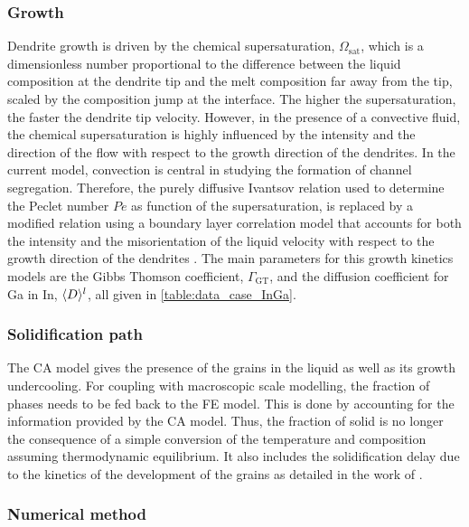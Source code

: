 \subsubsection{Growth}

Dendrite growth is driven by the chemical supersaturation, $\Omega_\text{sat}$, which is a 
dimensionless number proportional to the difference between the liquid composition at the dendrite 
tip and the melt composition far away from the tip, scaled by the composition jump at the interface. 
The higher the supersaturation, the faster the 
dendrite tip velocity. However, in the presence of a convective fluid, the chemical supersaturation 
is highly influenced by the intensity and the direction of the flow with respect to the growth direction 
of the dendrites. In the current model, convection is central in studying the formation of channel segregation. Therefore, 
the purely diffusive Ivantsov relation used to determine the Peclet number $Pe$ as function of the supersaturation, 
is replaced by a modified relation using a boundary layer correlation model that accounts for both the intensity 
and the misorientation of the liquid velocity with respect to the growth direction of the dendrites \citep{gandin_boundary_2003}. 
The main parameters for this growth kinetics models are the Gibbs Thomson coefficient, $\Gamma_{\text{GT}}$, and the diffusion 
coefficient for Ga in In, $\langle D \rangle^l$, all given in \cref{table:data_case_InGa}.

\subsubsection{Solidification path}

The CA model gives the presence of the grains in the liquid as well as its growth undercooling. 
For coupling with macroscopic scale modelling, the fraction of phases needs to be fed back to the 
FE model. This is done by accounting for the information provided by the CA model. Thus, the 
fraction of solid is no longer the consequence of a simple conversion of the temperature and 
composition assuming thermodynamic equilibrium. It also includes the solidification delay due to 
the kinetics of the development of the grains as detailed in the work of \citet{carozzani_direct_2013}.

\subsubsection{Numerical method}

